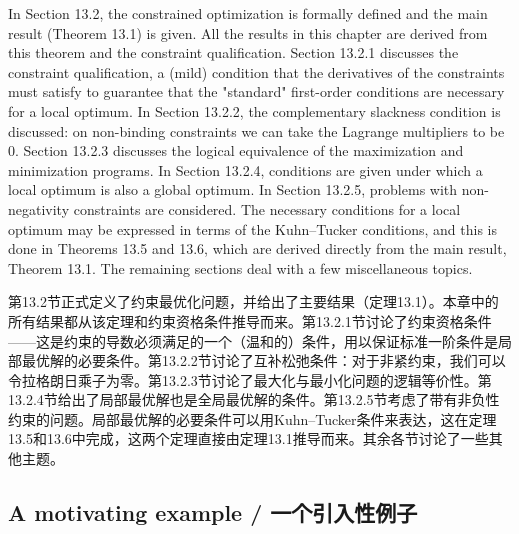 \begin{original}
In Section 13.2, the constrained optimization is formally defined and the main result (Theorem 13.1) is given. All the results in this chapter are derived from this theorem and the constraint qualification. Section 13.2.1 discusses the constraint qualification, a (mild) condition that the derivatives of the constraints must satisfy to guarantee that the "standard" first-order conditions are necessary for a local optimum. In Section 13.2.2, the complementary slackness condition is discussed: on non-binding constraints we can take the Lagrange multipliers to be 0. Section 13.2.3 discusses the logical equivalence of the maximization and minimization programs. In Section 13.2.4, conditions are given under which a local optimum is also a global optimum. In Section 13.2.5, problems with non-negativity constraints are considered. The necessary conditions for a local optimum may be expressed in terms of the Kuhn--Tucker conditions, and this is done in Theorems 13.5 and 13.6, which are derived directly from the main result, Theorem 13.1. The remaining sections deal with a few miscellaneous topics.
\end{original}
\begin{translation}
第13.2节正式定义了约束最优化问题，并给出了主要结果（定理13.1）。本章中的所有结果都从该定理和约束资格条件推导而来。第13.2.1节讨论了约束资格条件——这是约束的导数必须满足的一个（温和的）条件，用以保证标准一阶条件是局部最优解的必要条件。第13.2.2节讨论了互补松弛条件：对于非紧约束，我们可以令拉格朗日乘子为零。第13.2.3节讨论了最大化与最小化问题的逻辑等价性。第13.2.4节给出了局部最优解也是全局最优解的条件。第13.2.5节考虑了带有非负性约束的问题。局部最优解的必要条件可以用Kuhn--Tucker条件来表达，这在定理13.5和13.6中完成，这两个定理直接由定理13.1推导而来。其余各节讨论了一些其他主题。
\end{translation}

\subsection{A motivating example / 一个引入性例子}

